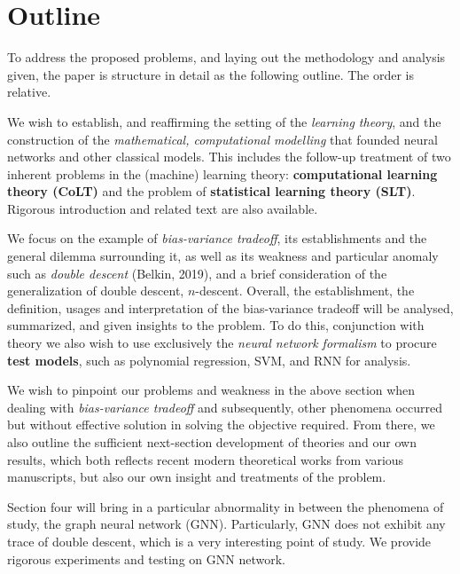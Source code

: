 \section{Outline}
To address the proposed problems, and laying out the methodology and analysis given, the paper is structure in detail as the following outline. The order is relative.

\begin{enumerate}[leftmargin=0cm,label={[\arabic*]}]
    \item We wish to establish, and reaffirming the setting of the \textit{learning theory}, and the construction of the \textit{mathematical, computational modelling} that founded neural networks and other classical models. This includes the follow-up treatment of two inherent problems in the (machine) learning theory: \textbf{computational learning theory (CoLT)} and the problem of \textbf{statistical learning theory (SLT)}. Rigorous introduction and related text are also available. 
    \item We focus on the example of \textit{bias-variance tradeoff}, its establishments and the general dilemma surrounding it, as well as its weakness and particular anomaly such as \textit{double descent} (Belkin, 2019), and a brief consideration of the generalization of double descent, $n$-descent. Overall, the establishment, the definition, usages and interpretation of the bias-variance tradeoff will be analysed, summarized, and given insights to the problem. To do this, conjunction with theory we also wish to use exclusively the \textit{neural network formalism} to procure \textbf{test models}, such as polynomial regression, SVM, and RNN for analysis. 
    \item We wish to pinpoint our problems and weakness in the above section when dealing with \textit{bias-variance tradeoff} and subsequently, other phenomena occurred but without effective solution in solving the objective required. From there, we also outline the sufficient next-section development of theories and our own results, which both reflects recent modern theoretical works from various manuscripts, but also our own insight and treatments of the problem. 
    \item Section four will bring in a particular abnormality in between the phenomena of study, the graph neural network (GNN). Particularly, GNN does not exhibit any trace of double descent, which is a very interesting point of study. We provide rigorous experiments and testing on GNN network. 
\end{enumerate}


